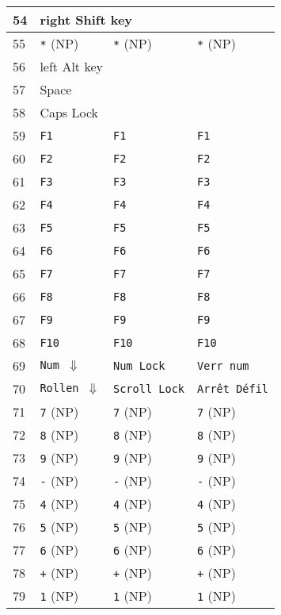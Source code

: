 \begin{longtable}{|l|l|l|l|}
  54 & \multicolumn{3}{|l|}{right Shift key} \\ \hline
  55 & \texttt{*} (NP) & \texttt{*} (NP) & \texttt{*} (NP) \\ \hline
  56 & \multicolumn{3}{|l|}{left Alt key} \\ \hline
  57 & \multicolumn{3}{|l|}{Space} \\ \hline
  58 & \multicolumn{3}{|l|}{Caps Lock} \\ \hline
  59 & \texttt{F1} & \texttt{F1} & \texttt{F1} \\ \hline
  60 & \texttt{F2} & \texttt{F2} & \texttt{F2} \\ \hline
  61 & \texttt{F3} & \texttt{F3} & \texttt{F3} \\ \hline
  62 & \texttt{F4} & \texttt{F4} & \texttt{F4} \\ \hline
  63 & \texttt{F5} & \texttt{F5} & \texttt{F5} \\ \hline
  64 & \texttt{F6} & \texttt{F6} & \texttt{F6} \\ \hline
  65 & \texttt{F7} & \texttt{F7} & \texttt{F7} \\ \hline
  66 & \texttt{F8} & \texttt{F8} & \texttt{F8} \\ \hline
  67 & \texttt{F9} & \texttt{F9} & \texttt{F9} \\ \hline
  68 & \texttt{F10} & \texttt{F10} & \texttt{F10} \\ \hline
  69 & \texttt{Num $\Downarrow$} & \texttt{Num Lock} & \texttt{Verr num} \\ \hline
  70 & \texttt{Rollen $\Downarrow$} & \texttt{Scroll Lock} & \texttt{Arrêt Défil} \\ \hline
  71 & \texttt{7} (NP) & \texttt{7} (NP) & \texttt{7} (NP) \\ \hline
  72 & \texttt{8} (NP) & \texttt{8} (NP) & \texttt{8} (NP) \\ \hline
  73 & \texttt{9} (NP) & \texttt{9} (NP) & \texttt{9} (NP) \\ \hline
  74 & \texttt{-} (NP) & \texttt{-} (NP) & \texttt{-} (NP) \\ \hline
  75 & \texttt{4} (NP) & \texttt{4} (NP) & \texttt{4} (NP) \\ \hline
  76 & \texttt{5} (NP) & \texttt{5} (NP) & \texttt{5} (NP) \\ \hline
  77 & \texttt{6} (NP) & \texttt{6} (NP) & \texttt{6} (NP) \\ \hline
  78 & \texttt{+} (NP) & \texttt{+} (NP) & \texttt{+} (NP) \\ \hline
  79 & \texttt{1} (NP) & \texttt{1} (NP) & \texttt{1} (NP) \\ \hline

\end{longtable}

